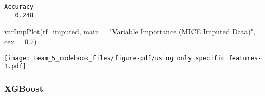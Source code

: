 \documentclass[
  letterpaper,
  DIV=11,
  numbers=noendperiod]{scrartcl}
\newenvironment{Shaded}{\begin{snugshade}}{\end{snugshade}}
\newcommand{\AttributeTok}[1]{\textcolor[rgb]{0.40,0.45,0.13}{#1}}
\newcommand{\FloatTok}[1]{\textcolor[rgb]{0.68,0.00,0.00}{#1}}
\newcommand{\FunctionTok}[1]{\textcolor[rgb]{0.28,0.35,0.67}{#1}}
\newcommand{\NormalTok}[1]{\textcolor[rgb]{0.00,0.23,0.31}{#1}}
\newcommand{\StringTok}[1]{\textcolor[rgb]{0.13,0.47,0.30}{#1}}
\begin{document}
\begin{verbatim}
Accuracy 
   0.248 
\end{verbatim}

\begin{Shaded}
\begin{Highlighting}[]
\FunctionTok{varImpPlot}\NormalTok{(rf\_imputed, }\AttributeTok{main =} \StringTok{"Variable Importance (MICE Imputed Data)"}\NormalTok{, }\AttributeTok{cex =} \FloatTok{0.7}\NormalTok{)}
\end{Highlighting}
\end{Shaded}

\begin{center}
\texttt{[image: team\_5\_codebook\_files/figure-pdf/using only specific features-1.pdf]}
\end{center}

\subsubsection{XGBoost}\label{xgboost}
\end{document}
